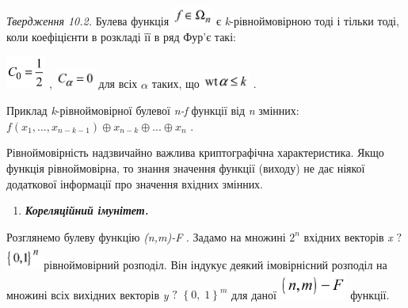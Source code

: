 \documentclass[a4paper]{article}
\newcounter{saveenum}
\newcommand\liststyleWWviiiNumxxix{%
\renewcommand\theenumi{\arabic{enumi}}
\renewcommand\theenumii{\arabic{enumii}}
\renewcommand\theenumiii{\roman{enumiii}}
\renewcommand\theenumiv{\arabic{enumiv}}
\renewcommand\labelenumi{\theenumi.}
\renewcommand\labelenumii{\theenumii.}
\renewcommand\labelenumiii{\theenumiii.}
\renewcommand\labelenumiv{\theenumiv.}
}
\newcounter{}
\begin{document}
\textit{Твердження 10.2}\textit{. }Булева функція 
\includegraphics[width=0.528in,height=0.25in]{crypt-img/crypt-img203.png}  є
\textit{k}{}-рівноймовірною\textit{ }тоді і тільки тоді, коли коефіцієнти в
розкладі її в ряд Фур’є такі:

{\centering
 \includegraphics[width=0.5138in,height=0.4307in]{crypt-img/crypt-img204.png} , 
 \includegraphics[width=0.5138in,height=0.25in]{crypt-img/crypt-img205.png} 
для всіх  ${\alpha }$\textit{ }таких, що 
\includegraphics[width=0.611in,height=0.1937in]{crypt-img/crypt-img206.png} .
\par}

Приклад \textit{k}{}-рівноймовірної булевої\textit{
}\textit{n}\textit{{}-}\textit{f}  функції від \textit{n}\textit{ }змінних: 
${f(x_{{1}},\text{.}\text{.}\text{.},x_{{n-k-1}}){\oplus}x_{{n-k}}{\oplus}\text{.}\text{.}\text{.}{\oplus}x_{{n}}}$
.

Рівноймовірність надзвичайно важлива криптографічна характеристика. Якщо функція
рівноймовірна, то знання значення функції  (виходу) не дає ніякої додаткової
інформації про значення вхідних змінних.  


\bigskip

\liststyleWWviiiNumxxix
\setcounter{saveenum}{\value{enumi}}
\begin{enumerate}
\setcounter{enumi}{\value{saveenum}}
\item {\bfseries\itshape
Кореляційний імунітет.}
\end{enumerate}
Розглянемо булеву функцію
\textit{(}\textit{n}\textit{,}\textit{m}\textit{)-}\textit{F}  . Задамо на
множині  ${2^{{n}}}$ вхідних векторів \textit{x} ${?}$
\includegraphics[width=0.4437in,height=0.3193in]{crypt-img/crypt-img207.png} 
рівноймовірний розподіл. Він індукує деякий імовірнісний розподіл на множині
всіх вихідних векторів \textit{y} ${?}$ ${\left\{0,\;1\right\}^{{m}}}$ для
даної 
\includegraphics[width=0.8744in,height=0.3425in]{crypt-img/crypt-img208.png} 
функції.
\end{document}
